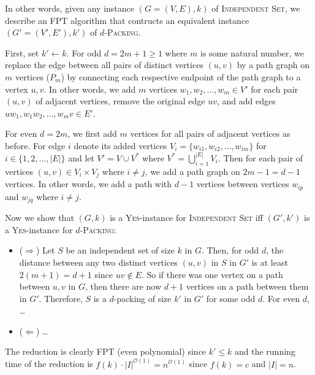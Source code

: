\documentclass[10pt, a4paper]{article}
\theoremstyle{definition}
\newcommand{\mcO}{\mathcal{O}}
\begin{document}
In other words, given any instance $(G=(V,E), k)$ of \textsc{Independent Set}, we describe an FPT algorithm that contructs an equivalent instance $(G'=(V',E'), k')$ of $d$-\textsc{Packing}.

First, set $k' \leftarrow k$. For odd $d=2m+1 \ge 1$ where $m$ is some natural number, we replace the edge between all pairs of distinct vertices $(u, v)$ by a path graph on $m$ vertices ($P_m$) by connecting each respective endpoint of the path graph to a vertex $u, v$. In other words, we add $m$ vertices $w_1, w_2, \dotsc, w_m \in V'$ for each pair $(u, v)$ of adjacent vertices, remove the original edge $uv$, and add edges $uw_1, w_1w_2, \dotsc, w_mv \in E'$.

For even $d=2m$, we first add $m$ vertices for all pairs of adjacent vertices as before. For edge $i$ denote its added vertices $V_{i} = \{w_{i1}, w_{i2}, \dotsc, w_{im}\}$ for $i \in \{1, 2, \dotsc, |E|\}$ and let $V' = V \cup V^{*}$ where $V^{*} = \bigcup_{i=1}^{|E|} V_i$. Then for each pair of vertices $(u, v) \in V_i \times V_j$ where $i \ne j$, we add a path graph on $2m-1 = d-1$ vertices. In other words, we add a path with $d-1$ vertices between vertices $w_{ip}$ and $w_{jq}$ where $i\ne j$.

Now we show that $(G, k)$ is a \textsc{Yes}-instance for \textsc{Independent Set} iff $(G', k')$ is a \textsc{Yes}-instance for $d$-\textsc{Packing}:

\begin{itemize}
	\item ($\Rightarrow$) Let $S$ be an independent set of size $k$ in $G$. Then, for odd $d$, the distance between any two distinct vertices $(u, v)$ in $S$ in $G'$ is at least $2(m+1)=d+1$ since $uv \notin E$. So if there was one vertex on a path between $u, v$ in $G$, then there are now $d+1$ vertices on a path between them in $G'$. Therefore, $S$ is a $d$-packing of size $k'$ in $G'$ for some odd $d$. For even $d$, \dots

	\item ($\Leftarrow$) \dots
\end{itemize}

The reduction is clearly FPT (even polynomial) since $k' \leq k$ and the running time of the reduction is $f(k) \cdot |I|^{\mcO(1)} = n^{\mcO(1)}$ since $f(k)=c$ and $|I| = n$.
\end{document}
